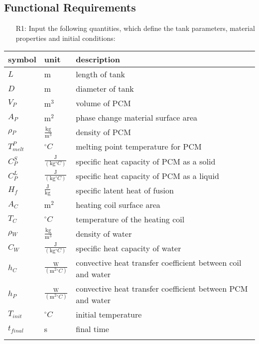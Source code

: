 \documentclass[12pt]{article}
\begin{document}
\subsection{Functional Requirements}
\label{Sec:FuncRequ}
\begin{itemize}
\item[R1:]Input the following quantities, which define the tank parameters, material properties and initial conditions:
\end{itemize}
\begin{longtable*}{l l l}
\toprule
symbol & unit & description
\\
\midrule
$L$ & m & length of tank
\\
$D$ & m & diameter of tank
\\
$V_{P}$ & $\text{m}^{3}$ & volume of PCM
\\
$A_{P}$ & $\text{m}^{2}$ & phase change material surface area
\\
$\rho{}_{P}$ & $\frac{\text{kg}}{\text{m}^{3}}$ & density of PCM
\\
$T_{melt}^{P}$ & ${}^{\circ}C$ & melting point temperature for PCM
\\
$C_{P}^{S}$ & $\frac{\text{J}}{(\text{kg}{}^{\circ}C)}$ & specific heat capacity of PCM as a solid
\\
$C_{P}^{L}$ & $\frac{\text{J}}{(\text{kg}{}^{\circ}C)}$ & specific heat capacity of PCM as a liquid
\\
$H_{f}$ & $\frac{\text{J}}{\text{kg}}$ & specific latent heat of fusion
\\
$A_{C}$ & $\text{m}^{2}$ & heating coil surface area
\\
$T_{C}$ & ${}^{\circ}C$ & temperature of the heating coil
\\
$\rho{}_{W}$ & $\frac{\text{kg}}{\text{m}^{3}}$ & density of water
\\
$C_{W}$ & $\frac{\text{J}}{(\text{kg}{}^{\circ}C)}$ & specific heat capacity of water
\\
$h_{C}$ & $\frac{\text{W}}{(\text{m}^{2}{}^{\circ}C)}$ & convective heat transfer coefficient between coil and water
\\
$h_{P}$ & $\frac{\text{W}}{(\text{m}^{2}{}^{\circ}C)}$ & convective heat transfer coefficient between PCM and water
\\
$T_{init}$ & ${}^{\circ}C$ & initial temperature
\\
$t_{final}$ & s & final time
\\
\bottomrule
\label{Table:InpuVariRequ}
\end{longtable*}
\end{document}
